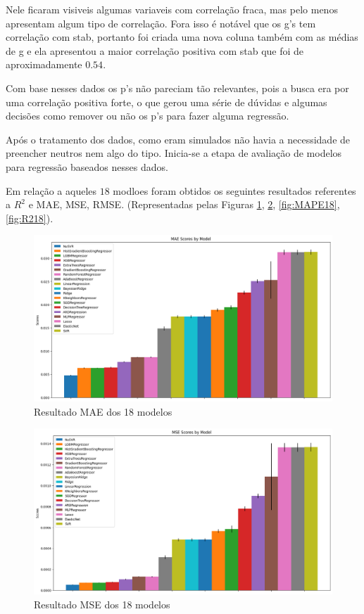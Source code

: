 \documentclass[journal]{IEEEtran}
\begin{document}
Nele ficaram visiveis algumas variaveis com correlação fraca, mas pelo menos apresentam algum tipo de correlação. Fora isso é notável que os g's tem correlação com stab, portanto foi criada uma nova coluna também com as médias de g e ela apresentou a maior correlação positiva com stab que foi de aproximadamente $0.54$.%

Com base nesses dados os p's não pareciam tão relevantes, pois a busca era por uma correlação positiva forte, o que gerou uma série de dúvidas e algumas decisões como remover ou não os p's para fazer alguma regressão.

Após o tratamento dos dados, como eram simulados não havia a necessidade de preencher neutros nem algo do tipo. Inicia-se a etapa de avaliação de modelos para regressão baseados nesses dados.

Em relação a aqueles $18$ modloes foram obtidos os seguintes resultados referentes a $R^2$ e MAE, MSE, RMSE. (Representadas pelas Figuras \ref{fig:MAE18}, \ref{fig:MSE18}, \ref{fig:MAPE18}, \ref{fig:R218}).

\begin{figure}[H]
    \centering
    \includegraphics[width=1\linewidth]{image.png}
    \caption{Resultado MAE dos 18 modelos}
    \label{fig:MAE18}
\end{figure}


\begin{figure}[H]
    \centering
    \includegraphics[width=1\linewidth]{image3.png}
    \caption{Resultado MSE dos 18 modelos}
    \label{fig:MSE18}
\end{figure}
\end{document}
